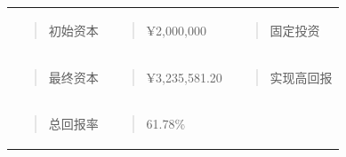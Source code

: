 \documentclass[UTF8]{ctexart}
\newcounter{none} %
\begin{document}
{\def\LTcaptype{none} %
\begin{longtable}[]{@{}
  >{\raggedright\arraybackslash}p{}
  >{\raggedright\arraybackslash}p{}
  >{\raggedright\arraybackslash}p{}@{}}
\toprule\noalign{}
\endhead
\bottomrule\noalign{}
\endlastfoot
\begin{minipage}[t]{\linewidth}\raggedright
\begin{quote}
初始资本
\end{quote}
\end{minipage} & \begin{minipage}[t]{\linewidth}\raggedright
\begin{quote}
¥2,000,000
\end{quote}
\end{minipage} & \begin{minipage}[t]{\linewidth}\raggedright
\begin{quote}
固定投资
\end{quote}
\end{minipage} \\
\begin{minipage}[t]{\linewidth}\raggedright
\begin{quote}
最终资本
\end{quote}
\end{minipage} & \begin{minipage}[t]{\linewidth}\raggedright
\begin{quote}
¥3,235,581.20
\end{quote}
\end{minipage} & \begin{minipage}[t]{\linewidth}\raggedright
\begin{quote}
实现高回报
\end{quote}
\end{minipage} \\
\begin{minipage}[t]{\linewidth}\raggedright
\begin{quote}
总回报率
\end{quote}
\end{minipage} & \begin{minipage}[t]{\linewidth}\raggedright
\begin{quote}
61.78\%
\end{quote}
\end{minipage} & \begin{minipage}[t]{\linewidth}\raggedright

\end{minipage}
\end{longtable}}
\end{document}
